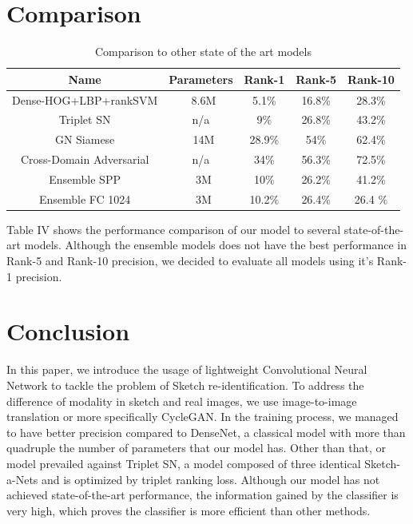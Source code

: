 \documentclass[conference]{IEEEtran}
\begin{document}
	\section{Comparison}
	\vspace{1ex}
	
	\begin{table}[h!]
		\begin{center}
			\begin{tabular}{|c|c|c|c|c|}
				\hline
				\textbf{Name} & \textbf{Parameters} & \textbf{Rank-1} & \textbf{Rank-5} & \textbf{Rank-10} \\ \hline
				Dense-HOG+LBP+rankSVM & ~8.6M & 5.1\% & 16.8\% & 28.3\% \\ \hline
				Triplet SN & n/a & 9\% & 26.8\% & 43.2\% \\ \hline
				GN Siamese & ~14M & 28.9\% & 54\% & 62.4\%\\ \hline
				Cross-Domain Adversarial & n/a & 34\% & 56.3\% & 72.5\%\\ \hline
				Ensemble SPP & ~3M& 10\% & 26.2\% & 41.2\% \\ \hline
				Ensemble FC 1024 & ~3M & 10.2\% & 26.4\% & 26.4 \%\\ \hline
			\end{tabular}
		\end{center}
		\vspace{1ex}
		\caption{Comparison to other state of the art models}
		\label{tabel:2}
	\end{table}
	
	
	Table IV shows the performance comparison of our model to several state-of-the-art models. Although the ensemble models does not have the best performance in Rank-5 and Rank-10 precision, we decided to evaluate all models using it's Rank-1 precision.
	
	\section{Conclusion}
	\vspace{1ex}
	In this paper, we introduce the usage of lightweight Convolutional Neural Network to tackle the problem of Sketch re-identification. To address the difference of modality in sketch and real images, we use image-to-image translation or more specifically CycleGAN. In the training process, we managed to have better precision compared to DenseNet, a classical model with more than quadruple the number of parameters that our model has. Other than that, or model prevailed against Triplet SN, a model composed of three identical Sketch-a-Nets and is optimized by triplet ranking loss. Although our model has not achieved state-of-the-art performance, the information gained by the classifier is very high, which proves the classifier is more efficient than other methods.
	
	
	
\end{document}
